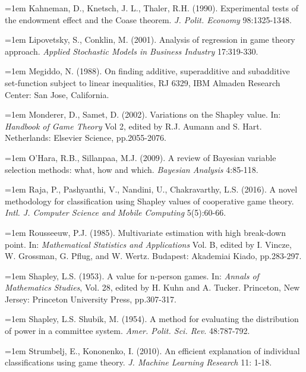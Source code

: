 \documentclass[a4paper,12pt]{article}
\begin{document}
\hangindent=1em
\noindent Kahneman, D.,  Knetsch, J. L.,  Thaler, R.H.  (1990).
Experimental tests of the endowment effect and the Coase theorem.
\textit{J.  Polit. Economy} 98:1325-1348.

\hangindent=1em
\noindent  Lipovetsky, S.,   Conklin, M. (2001).
Analysis of regression in game theory approach.
\textit{Applied Stochastic Models in Business Industry} 17:319-330.

\hangindent=1em
\noindent  Megiddo, N. (1988).
On finding additive, superadditive and subadditive set-function subject to linear inequalities,
RJ 6329, IBM Almaden Research Center: San Jose, California.

\hangindent=1em
\noindent   Monderer, D.,   Samet, D. (2002).
Variations on the Shapley value.
In:  \textit{Handbook of Game Theory} Vol 2, edited by R.J. Aumann and S. Hart.
Netherlands: Elsevier Science, pp.2055-2076.

\hangindent=1em
\noindent   O'Hara, R.B.,  Sillanpaa, M.J. (2009).
A review of Bayesian variable selection methods: what, how and which.
\textit{Bayesian Analysis} 4:85-118.

\hangindent=1em
\noindent Raja, P., Pashyanthi, V., Nandini, U.,  Chakravarthy,  L.S.  (2016).
A novel methodology for classification using Shapley values of cooperative game theory.
\textit{Intl.  J. Computer Science and Mobile Computing} 5(5):60-66.

\hangindent=1em
\noindent  Rousseeuw, P.J. (1985).
Multivariate estimation with high break-down point.
In: \textit{Mathematical Statistics and Applications} Vol. B, edited by I. Vincze, W. Grossman, G. Pflug, and W. Wertz.
Budapest: Akademiai Kiado, pp.283-297. 

\hangindent=1em
\noindent  Shapley, L.S. (1953).
A value for n-person games.
In: \textit{Annals of Mathematics Studies}, Vol. 28, edited by H. Kuhn and A. Tucker.
Princeton, New Jersey: Princeton University Press, pp.307-317.

\hangindent=1em
\noindent Shapley, L.S. Shubik, M. (1954).
A method for evaluating the distribution of power in a committee system. 
\textit{Amer. Polit. Sci. Rev.} 48:787-792.

\hangindent=1em
\noindent Strumbelj, E.,  Kononenko, I.  (2010).
An efficient explanation of individual classifications using game theory.
\textit{J.  Machine Learning Research} 11: 1-18.
\end{document}
